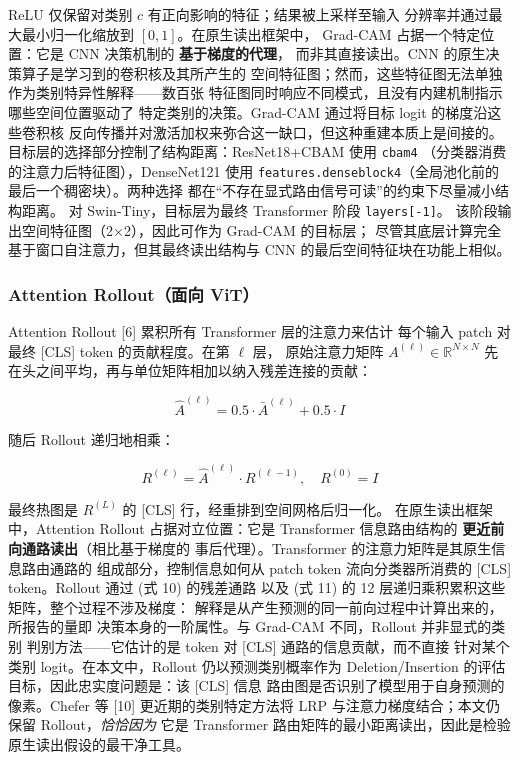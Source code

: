 \documentclass[11pt,a4paper]{article}
\begin{document}
ReLU 仅保留对类别 $c$ 有正向影响的特征；结果被上采样至输入 分辨率并通过最大最小归一化缩放到 $[0, 1]$。在原生读出框架中， Grad-CAM 占据一个特定位置：它是 CNN 决策机制的 \textbf{基于梯度的代理}， 而非其直接读出。CNN 的原生决策算子是学习到的卷积核及其所产生的 空间特征图；然而，这些特征图无法单独作为类别特异性解释——数百张 特征图同时响应不同模式，且没有内建机制指示哪些空间位置驱动了 特定类别的决策。Grad-CAM 通过将目标 logit 的梯度沿这些卷积核 反向传播并对激活加权来弥合这一缺口，但这种重建本质上是间接的。 目标层的选择部分控制了结构距离：ResNet18+CBAM 使用 \texttt{cbam4} （分类器消费的注意力后特征图），DenseNet121 使用 \texttt{features.denseblock4}（全局池化前的最后一个稠密块）。两种选择 都在“不存在显式路由信号可读”的约束下尽量减小结构距离。 对 Swin-Tiny，目标层为最终 Transformer 阶段 \texttt{layers[-1]}。 该阶段输出空间特征图（2×2），因此可作为 Grad-CAM 的目标层； 尽管其底层计算完全基于窗口自注意力，但其最终读出结构与 CNN 的最后空间特征块在功能上相似。

\subsubsection{Attention Rollout（面向 ViT）}

Attention Rollout [6] 累积所有 Transformer 层的注意力来估计 每个输入 patch 对最终 [CLS] token 的贡献程度。在第 $\ell$ 层， 原始注意力矩阵 $A^{(\ell)} \in \mathbb{R}^{N \times N}$ 先 在头之间平均，再与单位矩阵相加以纳入残差连接的贡献：

\begin{equation}
\hat{A}^{(\ell)} = 0.5 \cdot \bar{A}^{(\ell)} + 0.5 \cdot I
\tag{10}
\end{equation}

随后 Rollout 递归地相乘：

\begin{equation}
R^{(\ell)} = \hat{A}^{(\ell)} \cdot R^{(\ell-1)}, \quad R^{(0)} = I
\tag{11}
\end{equation}

最终热图是 $R^{(L)}$ 的 [CLS] 行，经重排到空间网格后归一化。 在原生读出框架中，Attention Rollout 占据对立位置：它是 Transformer 信息路由结构的 \textbf{更近前向通路读出}（相比基于梯度的 事后代理）。Transformer 的注意力矩阵是其原生信息路由通路的 组成部分，控制信息如何从 patch token 流向分类器所消费的 [CLS] token。Rollout 通过 (式 10) 的残差通路 以及 (式 11) 的 12 层递归乘积累积这些矩阵，整个过程不涉及梯度： 解释是从产生预测的同一前向过程中计算出来的，所报告的量即 决策本身的一阶属性。与 Grad-CAM 不同，Rollout 并非显式的类别 判别方法——它估计的是 token 对 [CLS] 通路的信息贡献，而不直接 针对某个类别 logit。在本文中，Rollout 仍以预测类别概率作为 Deletion/Insertion 的评估目标，因此忠实度问题是：该 [CLS] 信息 路由图是否识别了模型用于自身预测的像素。Chefer 等 [10] 更近期的类别特定方法将 LRP 与注意力梯度结合；本文仍保留 Rollout，\emph{恰恰因为} 它是 Transformer 路由矩阵的最小距离读出，因此是检验原生读出假设的最干净工具。
\end{document}
